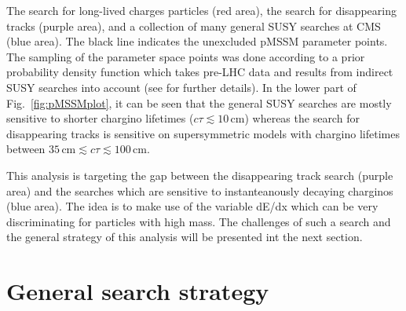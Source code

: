 The search for long-lived charges particles  \cite{bib:CMS:HSCP_8TeV} (red area), 
the search for disappearing tracks  \cite{bib:CMS:DT_8TeV} (purple area),
and a collection of many general SUSY searches at CMS \cite{bib:CMS:pMSSMinterpretation_7TeV_PAS} (blue area).
The black line indicates the unexcluded pMSSM parameter points.
The sampling of the parameter space points was done according to a prior probability density function which takes pre-LHC data and results from indirect SUSY searches into account (see \cite{bib:CMS:HSCPReinterpreation_PAS} for further details).
In the lower part of Fig.~\ref{fig:pMSSMplot}, it can be seen that the general SUSY searches are mostly sensitive 
to shorter chargino lifetimes ($c\tau \lesssim 10 \,\text{cm}$)
whereas the search for disappearing tracks is sensitive on supersymmetric models with chargino lifetimes between $35\,\text{cm} \lesssim c\tau \lesssim 100\,\text{cm}$.

This analysis is targeting the gap between the disappearing track search (purple area) and the searches which are sensitive to instanteanously decaying charginos (blue area). 
The idea is to make use of the variable dE/dx which can be very discriminating for particles with high mass.
The challenges of such a search and the general strategy of this analysis will be presented int the next section.

\chapter{General search strategy}
\label{sec:GeneralSearchStrategy}

